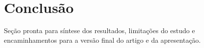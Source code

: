 \section{Conclus\~ao}

Se\c{c}\~ao pronta para s\'intese dos resultados, limita\c{c}\~oes do estudo e encaminhamentos para a vers\~ao final do artigo e da apresenta\c{c}\~ao.
